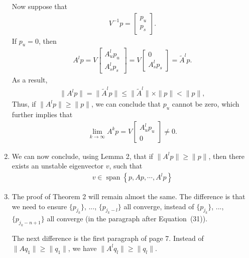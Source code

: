 \documentclass{article}
\DeclareMathOperator{\vecspan}{span}
\begin{document}
\begin{enumerate}
Now suppose that 
\begin{align*}
  V^{-1}p = \begin{bmatrix}
    p_u\\
    p_s
  \end{bmatrix}.
\end{align*}
If $p_u = 0$, then
\begin{align*}
  A^lp = V \begin{bmatrix}
    A_u^lp_u\\
    A_s^lp_s
  \end{bmatrix} = V \begin{bmatrix}
    0\\
    A_s^lp_s
  \end{bmatrix}  = \tilde A^l p.
\end{align*}
As a result,
\begin{align*}
  \|A^lp \| = \|\tilde A^l p\| \leq \|\tilde A^l\|\times \|p\| < \|p\|,
\end{align*}
Thus, if $\|A^lp\| \geq \|p\|$, we can conclude that $p_u$ cannot be zero, which further implies that
\begin{align*}
 \lim_{k\rightarrow\infty} A^k p = V \begin{bmatrix}
    A_u^lp_u\\
    0
  \end{bmatrix}\neq 0.
\end{align*}
\item We can now conclude, using Lemma 2, that if $\|A^lp\| \geq \|p\|$, then there exists an unstable eigenvector $v$, such that
  \begin{align*}
    v \in \vecspan\left\{p,Ap,\cdots,A^lp\right\}
  \end{align*}
\item The proof of Theorem 2 will remain almost the same. The difference is that  we need to ensure $\{p_{j_k}\}$, ..., $\{p_{j_k-l}\}$ all converge, instead of $\{p_{j_k}\}$, ..., $\{p_{j_k-n+1}\}$ all converge (in the paragraph after Equation~(31)).

  The next difference is the first paragraph of page 7. Instead of $\|Aq_1\| \geq \|q_1\|$, we have $\|A^l{q_l}\| \geq \|q_l\|$.
\end{enumerate}
\end{document}
